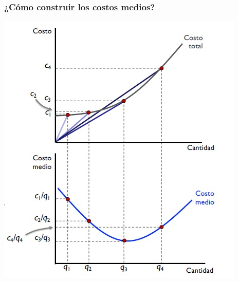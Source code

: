 \documentclass{beamer}
\begin{document}
\begin{frame}
\frametitle{¿Cómo construir los costos medios?}
\centering
\includegraphics[scale=0.6]{Slides Principios de Economia/Figures/Tema_06.21_funciondeproduccionmedialunas7.jpg}
\end{frame}

\end{document}
